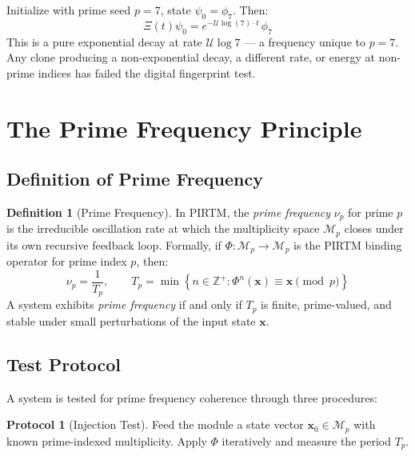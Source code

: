 \documentclass[12pt,letterpaper]{article}
\theoremstyle{definition}
\newtheorem{definition}{Definition}[section]
\newtheorem{protocol}{Protocol}[section]
\theoremstyle{remark}
\begin{document}
Initialize with prime seed $p = 7$, state $\psi_0 = \phi_7$. Then:
\begin{equation}
\Xi(t)\psi_0 = e^{-\mathcal{U}\log(7)\cdot t}\,\phi_7
\end{equation}
This is a pure exponential decay at rate $\mathcal{U}\log 7$ --- a frequency unique to $p=7$. Any clone producing a non-exponential decay, a different rate, or energy at non-prime indices has failed the digital fingerprint test.

\section{The Prime Frequency Principle}

\subsection{Definition of Prime Frequency}

\begin{definition}[Prime Frequency]
In PIRTM, the \emph{prime frequency} $\nu_p$ for prime $p$ is the irreducible oscillation rate at which the multiplicity space $\mathcal{M}_p$ closes under its own recursive feedback loop. Formally, if $\Phi: \mathcal{M}_p \to \mathcal{M}_p$ is the PIRTM binding operator for prime index $p$, then:
\begin{equation}
\nu_p = \frac{1}{T_p}, \qquad T_p = \min\left\{n \in \mathbb{Z}^+ : \Phi^n(\mathbf{x}) \equiv \mathbf{x} \pmod{p}\right\}
\end{equation}
A system exhibits \emph{prime frequency} if and only if $T_p$ is finite, prime-valued, and stable under small perturbations of the input state $\mathbf{x}$.
\end{definition}

\subsection{Test Protocol}

A system is tested for prime frequency coherence through three procedures:

\begin{protocol}[Injection Test]
Feed the module a state vector $\mathbf{x}_0 \in \mathcal{M}_p$ with known prime-indexed multiplicity. Apply $\Phi$ iteratively and measure the period $T_p$.
\end{protocol}
\end{document}
